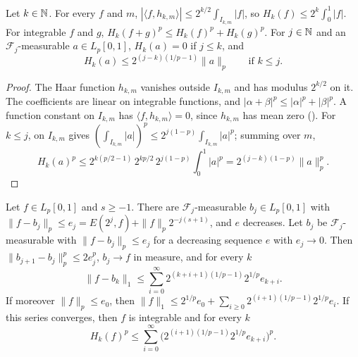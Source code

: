 \begin{lemma}
\label{lem:haar-level-norm}
\leanok
{}
Let $k \in \mathbb{N}$. For every $f$ and $m$,
$|\langle f, h_{k,m} \rangle| \leq 2^{k/2} \int_{I_{k,m}} |f|$, so
$H_k(f) \leq 2^k \int_0^1 |f|$. For integrable $f$ and $g$,
$H_k(f + g)^p \leq H_k(f)^p + H_k(g)^p$. For $j \in \mathbb{N}$ and an $\mathcal{F}_j$-measurable
$a \in L_p[0, 1]$, $H_k(a) = 0$ if $j \leq k$, and
\[
  H_k(a) \leq 2^{(j - k)(1/p - 1)} \|a\|_p \qquad \text{if } k \leq j .
\]
\end{lemma}

\begin{proof}
\leanok
The Haar function $h_{k,m}$ vanishes outside $I_{k,m}$ and has modulus $2^{k/2}$ on it. The
coefficients are linear on integrable functions, and $|\alpha + \beta|^p \leq |\alpha|^p +
|\beta|^p$. A function constant on $I_{k,m}$ has $\langle f, h_{k,m} \rangle = 0$, since
$h_{k,m}$ has mean zero (). For $k \leq j$,  on
$I_{k,m}$ gives $(\int_{I_{k,m}} |a|)^p \leq 2^{j(1-p)} \int_{I_{k,m}} |a|^p$; summing over $m$,
\[
  H_k(a)^p \leq 2^{k(p/2 - 1)} \, 2^{kp/2} \, 2^{j(1-p)} \int_0^1 |a|^p
  = 2^{(j - k)(1 - p)} \|a\|_p^p .
\]
\end{proof}

\begin{lemma}
\label{lem:near-best-steps}
\leanok
{}
Let $f \in L_p[0, 1]$ and $s \geq -1$. There are $\mathcal{F}_j$-measurable $b_j \in L_p[0, 1]$
with $\|f - b_j\|_p \leq e_j = E(2^j, f) + \|f\|_p 2^{-j(s+1)}$, and $e$ decreases. Let
$b_j$ be $\mathcal{F}_j$-measurable with $\|f - b_j\|_p \leq e_j$ for a decreasing sequence $e$
with $e_j \to 0$. Then $\|b_{j+1} - b_j\|_p^p \leq 2 e_j^p$, $b_j \to f$ in measure, and for every
$k$
\[
  \|f - b_k\|_1 \leq \sum_{i=0}^\infty 2^{(k+i+1)(1/p - 1)} 2^{1/p} e_{k+i} .
\]
If moreover $\|f\|_p \leq e_0$, then
$\|f\|_1 \leq 2^{1/p} e_0 + \sum_{i \geq 0} 2^{(i+1)(1/p - 1)} 2^{1/p} e_i$. If this series
converges, then $f$ is integrable and for every $k$
\[
  H_k(f)^p \leq \sum_{i=0}^\infty \bigl(2^{(i+1)(1/p - 1)} 2^{1/p} e_{k+i}\bigr)^p .
\]
\end{lemma}

